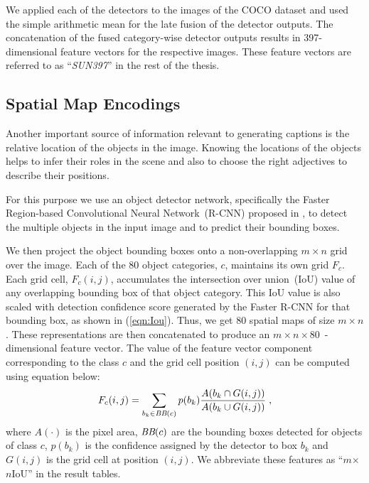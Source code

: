 We applied each of the detectors to the images of the COCO dataset and used the
simple arithmetic mean for the late fusion of the detector outputs.
The concatenation of the fused category-wise detector outputs results in
397-dimensional feature vectors for the respective images.
These feature vectors are referred to as ``\emph{SUN397}'' in the rest of the
thesis.

\subsection{Spatial Map Encodings}
\label{sec:frcnnfeat}
Another important source of information relevant to generating captions is the
relative location of the objects in the image. 
Knowing the locations of the objects helps to infer their roles in the scene and
also to choose the right adjectives to describe their positions.

For this purpose we use an object detector network, specifically the Faster
Region-based Convolutional Neural Network~(R-CNN) proposed in
\cite{ren15fasterrcnn}, to detect the multiple objects in the input image and to
predict their bounding boxes.

We then project the object bounding boxes onto a non-overlapping $m \times n$
grid over the image.
Each of the 80 object categories, $c$, maintains its own grid $F_c$.
Each grid cell, $F_c(i,j)$, accumulates the intersection over union~(IoU) value
of any overlapping bounding box of that object category. 
This IoU value is also scaled with detection confidence score generated by the
Faster R-CNN for that bounding box, as shown in (\ref{eqn:Iou}).
Thus, we get 80 spatial maps of size $m\times n$. 
These representations are then concatenated to produce an $m\times
n\times80$~-dimensional feature vector.
The value of the feature vector component corresponding to the class $c$ and the
grid cell position $(i,j)$ can be computed using equation below:
\begin{equation} 
\label{eqn:Iou} 
F_c(i,j) = \sum_{b_k \in \text{\it BB}(c)}p(b_k)\frac{ A(b_k \cap G(i,j))}{A(b_k \cup G(i,j))} \;, 
\end{equation}
where $A(\cdot)$ is the pixel area, $\text{\it BB}(c)$ are the bounding boxes
detected for objects of class $c$, $p(b_k)$ is the confidence assigned by the
detector to box $b_k$ and $G(i,j)$ is the grid cell at position $(i,j)$.
We abbreviate these features as ``$m$$\times${}$n$IoU'' in the result tables.

